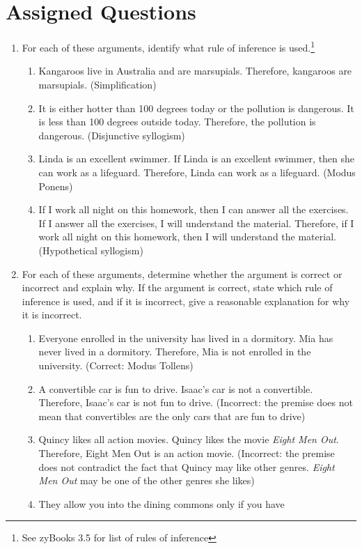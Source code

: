 \documentclass[12pt, oneside]{article}
\begin{document}
\section*{Assigned Questions}
\begin{enumerate}
\item For each of these arguments, identify what rule of
inference is used.\footnote{See zyBooks 3.5 for list of rules of
inference}
\begin{enumerate}
\item Kangaroos live in Australia and are marsupials.
Therefore, kangaroos are marsupials. (Simplification)
\item It is either hotter than 100 degrees today or the
pollution is dangerous. It is less than 100 degrees outside
today. Therefore, the pollution is dangerous. (Disjunctive syllogism)
\item Linda is an excellent swimmer. If Linda is an excellent
swimmer, then she can work as a lifeguard. Therefore, Linda can
work as a lifeguard. (Modus Ponens)
\item If I work all night on this homework, then I can answer
all the exercises. If I answer all the exercises, I will
understand the material. Therefore, if I work all night on this
homework, then I will understand the material. (Hypothetical syllogism)
\end{enumerate}
\item For each of these arguments, determine whether the argument
is correct or incorrect and explain why. If the argument is
correct, state which rule of inference is used, and if it is
incorrect, give a reasonable explanation for why it is incorrect.
\begin{enumerate}
\item Everyone enrolled in the university has lived in a
dormitory. Mia has never lived in a dormitory. Therefore, Mia is
not enrolled in the university. (Correct: Modus Tollens)
\item A convertible car is fun to drive. Isaac’s car is not a convertible. Therefore, Isaac’s car is not
fun to drive. (Incorrect: the premise does not mean that convertibles are the only cars that are fun to drive)
\item Quincy likes all action movies. Quincy likes the movie
{\it Eight Men Out}. Therefore, Eight Men Out is an action movie.
(Incorrect: the premise does not contradict the fact that Quincy may like other genres. {\it Eight Men Out} may be one of the other genres she likes)
\item They allow you into the dining commons only if you have

\end{enumerate}
\end{enumerate}
\end{document}
